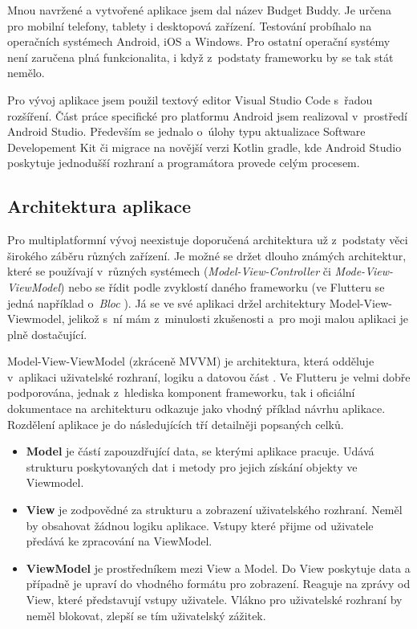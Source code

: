 \documentclass[
  biblatex,
  figures=true,
  tables=false,
  glossaries,
  index
]{kidiplom}
\begin{document}
Mnou navržené a vytvořené aplikace jsem dal název Budget Buddy. Je určena pro mobilní telefony, tablety i desktopová zařízení. Testování probíhalo na operačních systémech Android, iOS a Windows. Pro ostatní operační systémy není zaručena plná funkcionalita, i když z~podstaty frameworku by se tak stát nemělo.

Pro vývoj aplikace jsem použil textový editor Visual Studio Code s~řadou rozšíření. Část práce specifické pro platformu Android jsem realizoval v~prostředí Android Studio. Především se jednalo o~úlohy typu aktualizace Software Developement Kit či migrace na novější verzi Kotlin gradle, kde Android Studio poskytuje jednodušší rozhraní a programátora provede celým procesem.

\subsection{Architektura aplikace}
Pro multiplatformní vývoj neexistuje doporučená architektura už z~podstaty věci širokého záběru různých zařízení. Je možné se držet dlouho známých architektur, které se používají v~různých systémech (\textit{Model-View-Controller} či \textit{Mode-View-ViewModel}) nebo se řídit podle zvyklostí daného frameworku (ve Flutteru se jedná například o~\textit{Bloc} \cite{bloc}). Já se ve své aplikaci držel architektury Model-View-Viewmodel, jelikož s~ní mám z~minulosti zkušenosti a~pro moji malou aplikaci je plně dostačující. 

Model-View-ViewModel (zkráceně MVVM) je architektura, která odděluje v~aplikaci uživatelské rozhraní, logiku a datovou část \cite{mvvm}. Ve Flutteru je velmi dobře podporována, jednak z~hlediska komponent frameworku, tak i oficiální dokumentace na architekturu odkazuje jako vhodný příklad návrhu aplikace. Rozdělení aplikace je do následujících tří detailněji popsaných celků.
\begin{itemize}
  \item \textbf{Model} je částí zapouzdřující data, se kterými aplikace pracuje. Udává strukturu poskytovaných dat i metody pro jejich získání objekty ve Viewmodel.
  \item \textbf{View} je zodpovědné za strukturu a zobrazení uživatelského rozhraní. Neměl by obsahovat žádnou logiku aplikace. Vstupy které přijme od uživatele předává ke zpracování na ViewModel. 
  \item \textbf{ViewModel} je prostředníkem mezi View a Model. Do View poskytuje data a případně je upraví do vhodného formátu pro zobrazení. Reaguje na zprávy od View, které představují vstupy uživatele. Vlákno pro uživatelské rozhraní by neměl blokovat, zlepší se tím uživatelský zážitek.
\end{itemize}
\end{document}
